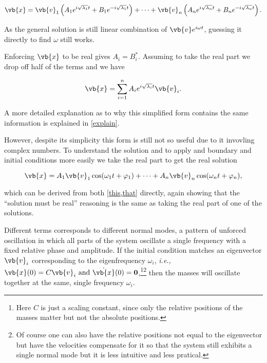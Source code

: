 \documentclass[a4paper,12pt]{report}
\begin{document}
\begin{equation}
	\vb{x} = \vb{v} _{1}\left(A_1 e^{i\sqrt{\lambda _{1}  } t} + B_1 e^{-i\sqrt{\lambda _{1}  } t}\right) + \cdots + \vb{v} _{n} \left(A_{n} e^{i\sqrt{\lambda _{n}  } t} + B_{n} e^{-i\sqrt{\lambda _{n}  } t}\right).
\end{equation}

As the general solution is still linear combination of \(\vb{v} e^{i \omega t} \), guessing it directly to find \(\omega \) still works.  

Enforcing \(\vb{x} \) to be real gives \(A_{i} = B_{i}^*  \). Assuming to take the real part we drop off half of the terms and we have 

\begin{equation}
	\vb{x} = \sum_{i=1}^{n} A_{i}e^{i \sqrt{\lambda _{i} }t }\vb{v} _{i}.   \label{this} 
\end{equation}

A more detailed explanation as to why this simplified form contains the same information is explained in \cref{explain}.

However, despite its simplicity this form is still not so useful due to it invovling complex numbers. To understand the solution and to apply and boundary and initial conditions more easily we take the real part to get the real solution 

\begin{equation}
	\vb{x} = A_1 \vb{v} _{1}\cos (\omega _{1}t+\varphi _{1}  ) + \cdots + A_{n} \vb{v} _{n} \cos (\omega _{n}t + \varphi _{n}  ),   \label{that} 
\end{equation}

which can be derived from both \cref{this,that} directly, again showing that the ``solution must be real'' reasoning is the same as taking the real part of one of the solutions.

Different terms corresponds to different normal modes, a pattern of unforced oscillation in which all parts of the system oscillate a single frequency with a fixed relative phase and amplitude. If the initial condition matches an eigenvector \(\vb{v} _{i} \) corresponding to the eigenfrequency \(\omega _{i} \), \textit{i.e.,} \(\vb{x} (0) = C \vb{v} _{i} \text { and } \dot{\vb{x} }(0) = \boldsymbol{0}  \),\footnote{Here \(C\) is just a scaling constant, since only the relative positions of the masses matter but not the absolute positions.}\footnote{Of course one can also have the relative positions not equal to the eigenvector but have the velocities compensate for it so that the system still exhibits a single normal mode but it is less intuitive and less pratical.} then the masses will oscillate together at the same, single frequency \(\omega _{i} \).  
\end{document}
